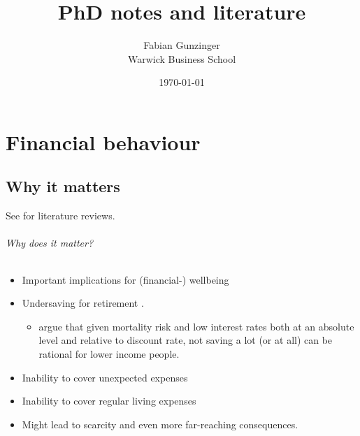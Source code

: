 \documentclass[a4paper, 11pt]{report}
\title{\textbf{PhD notes and literature}}
\author{Fabian Gunzinger \\ Warwick Business School}
\date{\today}
\begin{document}
\maketitle
\tableofcontents
\newpage






						\part{Financial behaviour}


						\chapter{Why it matters}

See \citet{agarwal2017shapes,greenberg2019financial} for literature reviews.


\paragraph{Why does it matter?}
\begin{itemize}
	\item Important implications for (financial-) wellbeing \citep{lynch2011introduction}

	\item Undersaving for retirement \citep{benartzi2013behavioral}.
	\begin{itemize}
		\item \citet{scott2020can} argue that given mortality risk and low interest rates both at an absolute level and relative to discount rate, not saving a lot (or at all) can be rational for lower income people.
	\end{itemize}

	\item Inability to cover unexpected expenses \citep{lusardi2011financially}

	\item Inability to cover regular living expenses

	\item Might lead to scarcity and even more far-reaching consequences.
\end{itemize}
\end{document}
